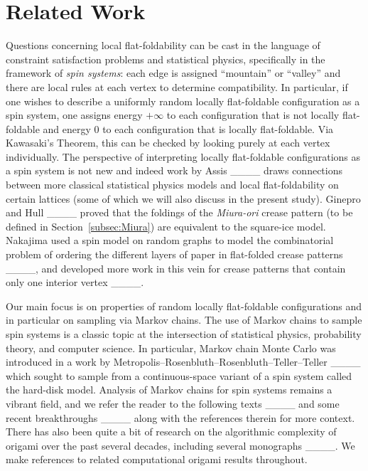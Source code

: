 \section{Related Work}
Questions concerning local flat-foldability can be cast in the language of constraint satisfaction problems and statistical physics, specifically in the framework of \emph{spin systems}: each edge is assigned ``mountain'' or ``valley'' and there are local rules at each vertex to determine compatibility.  In particular, if one wishes to describe a uniformly random locally flat-foldable configuration as a spin system, one assigns energy $+\infty$ to each configuration that is not locally flat-foldable and energy $0$ to each configuration that is locally flat-foldable.  Via Kawasaki's Theorem, this can be checked by looking purely at each vertex individually. The perspective of interpreting locally flat-foldable configurations as a spin system is not new and indeed work by Assis ____ draws connections between more classical statistical physics models and local flat-foldability on certain lattices (some of which we will also discuss in the present study).
Ginepro and Hull ____ proved that the foldings of the \textit{Miura-ori} crease pattern (to be defined in Section~\ref{subsec:Miura}) are equivalent to the square-ice model. 
Nakajima used a spin model on random graphs to model the combinatorial problem of ordering the different layers of paper in flat-folded crease patterns ____, and developed more work in this vein for crease patterns that contain only one interior vertex ____. 

Our main focus is on properties of random locally flat-foldable configurations and in particular on sampling via Markov chains.  The use of Markov chains to sample spin systems is a classic topic at the intersection of statistical physics, probability theory, and computer science.  In particular, Markov chain Monte Carlo was introduced in a work by Metropolis--Rosenbluth--Rosenbluth--Teller--Teller ____ which sought to sample from a continuous-space variant of a spin system called the hard-disk model.  Analysis of Markov chains for spin systems remains a vibrant field, and we refer the reader to the following texts ____ and some recent breakthroughs ____ along with the references therein for more context.
There has also been quite a bit of research on the algorithmic complexity of origami over the past several decades, including several monographs ____. We make references to related computational origami results throughout.